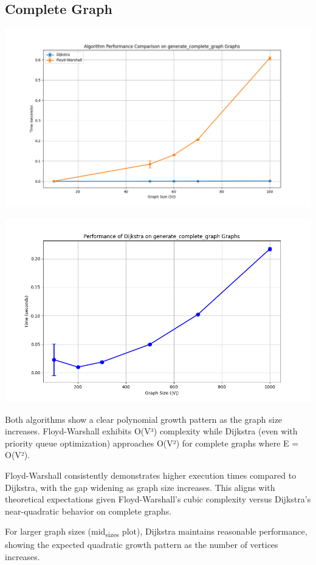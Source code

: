 \documentclass[a4paper,12pt]{article}
\begin{document}
\subsection{Complete Graph}
\label{sec:orgef74f74}
\begin{center}
\includegraphics[width=.9\linewidth]{dijkstra_floyd_complete.png}
\label{org1a5bdf6}
\end{center}
\begin{center}
\includegraphics[width=.9\linewidth]{dijkstra_complete.png}
\label{orgb548fab}
\end{center}

Both algorithms show a clear polynomial growth pattern as the graph size increases. Floyd-Warshall exhibits O(V³) complexity while Dijkstra (even with priority queue optimization) approaches O(V²) for complete graphs where E = O(V²).

Floyd-Warshall consistently demonstrates higher execution times compared to Dijkstra, with the gap widening as graph size increases. This aligns with theoretical expectations given Floyd-Warshall's cubic complexity versus Dijkstra's near-quadratic behavior on complete graphs.

For larger graph sizes (mid\textsubscript{sizes} plot), Dijkstra maintains reasonable performance, showing the expected quadratic growth pattern as the number of vertices increases.
\end{document}
